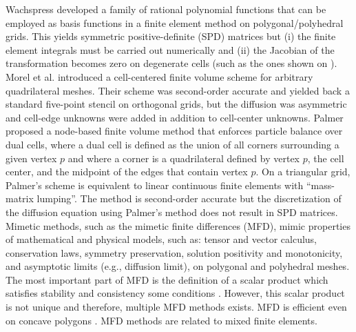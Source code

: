 Wachspress \cite{Wachspress} developed a family of rational polynomial functions that can be employed
as basis functions in a finite element method on polygonal/polyhedral grids. This yields
symmetric positive-definite (SPD) matrices but (i) the finite element integrals must be carried out 
numerically and (ii) the Jacobian of the transformation becomes zero on degenerate cells 
(such as the ones shown on ). 
%
Morel et al. \cite{MorelDendyHallWhite1992} introduced a cell-centered finite volume scheme 
for arbitrary quadrilateral meshes. Their scheme was second-order accurate and yielded back a 
standard five-point stencil on orthogonal grids, but the diffusion was asymmetric and cell-edge unknowns
were added in addition to cell-center unknowns.
%
Palmer \cite{PalmerLLNL,Palmer2005} proposed a node-based finite volume method 
that enforces particle balance over dual cells, where a dual cell is defined as 
the union of all corners surrounding a given vertex $p$ and where  a corner 
is a quadrilateral defined by vertex $p$, the cell center, and the midpoint
of the edges that contain vertex $p$. On a triangular grid, Palmer's scheme is equivalent 
to linear continuous finite elements with ``mass-matrix lumping''. The method is 
second-order accurate but the discretization of the diffusion equation using Palmer's method 
does not result in SPD matrices.
%
Mimetic methods, such as the mimetic finite differences (MFD), mimic properties of
mathematical and physical models, such as: tensor and vector calculus,
conservation laws, symmetry preservation, solution positivity and
monotonicity, and asymptotic limits (e.g., diffusion limit), on polygonal and
polyhedral meshes. The most important part of MFD is the definition of a scalar
product which satisfies stability and consistency some conditions
\cite{Brezzi2005}. However, this scalar product is not unique and therefore,
multiple MFD methods exists. MFD is efficient even on concave polygons
\cite{Kuznetsov2004}. MFD methods are related to mixed finite elements.








